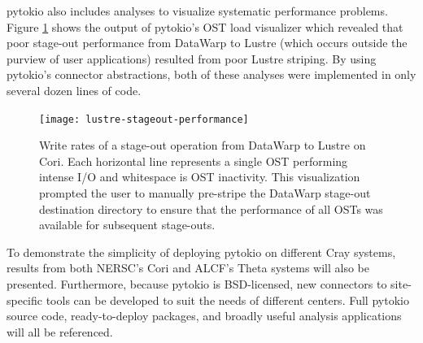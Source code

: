 pytokio also includes analyses to visualize systematic performance problems.  Figure \ref{fig:lustre-heatmap} shows the output of pytokio's OST load visualizer which revealed that poor stage-out performance from DataWarp to Lustre (which occurs outside the purview of user applications) resulted from poor Lustre striping.  By using pytokio's connector abstractions, both of these analyses were implemented in only several dozen lines of code.

\begin{figure}[t]
    \centering
    \texttt{[image: lustre-stageout-performance]}
    \vspace{-.3in}
    \caption{Write rates of a stage-out operation from DataWarp to Lustre on Cori.  Each horizontal line represents a single OST performing intense I/O and whitespace is OST inactivity.  This visualization prompted the user to manually pre-stripe the DataWarp stage-out destination directory to ensure that the performance of all OSTs was available for subsequent stage-outs.}
    \label{fig:lustre-heatmap}
    \vspace{-.2in}
\end{figure}

To demonstrate the simplicity of deploying pytokio on different Cray systems, results from both NERSC's Cori and ALCF's Theta systems will also be presented.  Furthermore, because pytokio is BSD-licensed, new connectors to site-specific tools can be developed to suit the needs of different centers.  Full pytokio source code, ready-to-deploy packages, and broadly useful analysis applications will all be referenced.